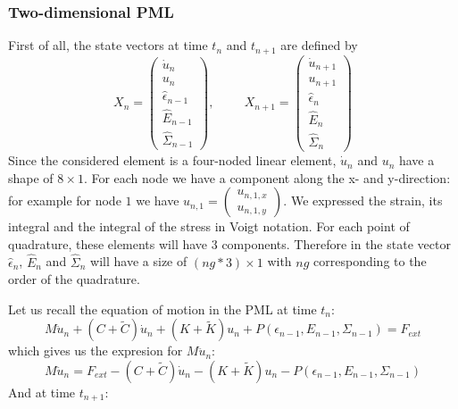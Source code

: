 \subsubsection{Two-dimensional PML}
First of all, the state vectors at time $t_n$ and $t_{n+1}$ are defined by
\begin{equation}
X_n = \begin{pmatrix}
\dot{u}_n \\
u_n \\
\hat{\epsilon}_{n-1} \\
\hat{E}_{n-1} \\
\hat{\Sigma}_{n-1}
\end{pmatrix}, \hspace{1cm}
X_{n+1}= \begin{pmatrix}
\dot{u}_{n+1} \\
u_{n+1} \\
\hat{\epsilon}_{n} \\
\hat{E}_{n} \\
\hat{\Sigma}_{n}
\end{pmatrix}
\end{equation}  
Since the considered element is a four-noded linear element, $\dot{u}_n$ and $u_n$ have a shape of $8 \times 1$. For each node we have a component along the x- and y-direction: for example for node $1$ we have $u_{n,1} = \begin{pmatrix}
u_{n,1,x}\\ u_{n,1,y}
\end{pmatrix} $. We expressed the strain, its integral and the integral of the stress in Voigt notation. For each point of quadrature, these elements will have $3$ components. Therefore in the state vector $\hat{\epsilon}_{n}$, $\hat{E}_{n}$ and $\hat{\Sigma}_{n}$ will have a size of $(ng*3) \times 1$ with $ng$ corresponding to the order of the quadrature.   
\par Let us recall the equation of motion in the PML at time $t_n$:
\begin{equation}
M \ddot{u}_n +\left(C+\tilde{C}\right)\dot{u}_n 
+\left(K+\tilde{K}\right)u_n + P(\epsilon_{n-1},E_{n-1},\Sigma_{n-1}) = F_{ext}
\label{eq:motion-pml-tn}
\end{equation}
which gives us the expresion for $M\ddot{u}_n$:
\begin{equation}
M \ddot{u}_n = F_{ext} -\left(C+\tilde{C}\right)\dot{u}_n 
-\left(K+\tilde{K}\right)u_n - P(\epsilon_{n-1},E_{n-1},\Sigma_{n-1})
\label{eq:motion-pml-tn-reorganized}
\end{equation}
And at time $t_{n+1}$:
